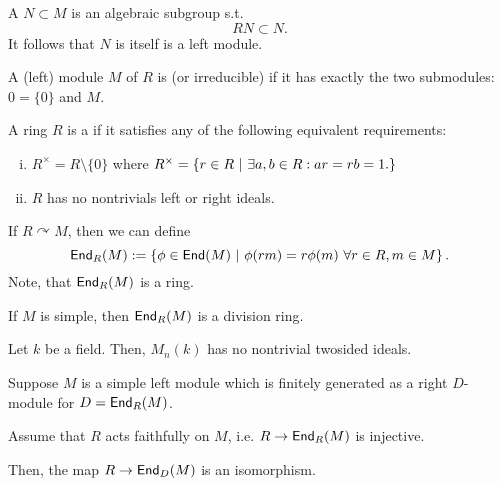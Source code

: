 \begin{definition}
	A  $N \subset M$ is an algebraic subgroup s.t.
	\[ RN \subset N. \]
	It follows that $N$ is itself is a left module.
\end{definition}
\begin{definition}
	A (left) module $M$ of $R$ is  (or irreducible) if it has exactly the two submodules: $0 = \{0\}$ and $M$.
\end{definition}
\begin{definition}
	A ring $R$ is a  if it satisfies any of the following equivalent requirements:
	\begin{enumerate}[(i)]
		\item $R^\times = R \setminus \{0\} $
		where $R^\times = \left\lbrace r \in R ~ | ~ \exists a,b \in R: ar = rb = 1.\right\rbrace$
		\item $R$ has no nontrivials left or right ideals.
	\end{enumerate}
\end{definition}
\begin{definition}
If $R \curvearrowright M$, then we can define
\[ \textsf{End}_R(M) := \left\lbrace\phi \in \textsf{End}(M) ~ | ~ \phi(rm) = r\phi(m) ~\forall r\in R, m \in M\right\rbrace. \]
Note, that $\textsf{End}_R(M)$ is a ring.
\end{definition}
\begin{lemma}
	If $M$ is simple, then $\textsf{End}_R(M)$ is a division ring.
\end{lemma}
\begin{lemma}
	Let $k$ be a field. Then, $M_n(k)$ has no nontrivial twosided ideals.
\end{lemma}
\begin{theorem}
Suppose $M$ is a simple left module which is finitely generated as a right $D$-module for $D = \textsf{End}_R(M)$.

Assume that $R$ acts faithfully on $M$, i.e. $R \overset{}{\rightarrow} \textsf{End}_R(M)$ is injective.

Then, the map $R \overset{}{\rightarrow} \textsf{End}_D(M)$ is an isomorphism.
\end{theorem}